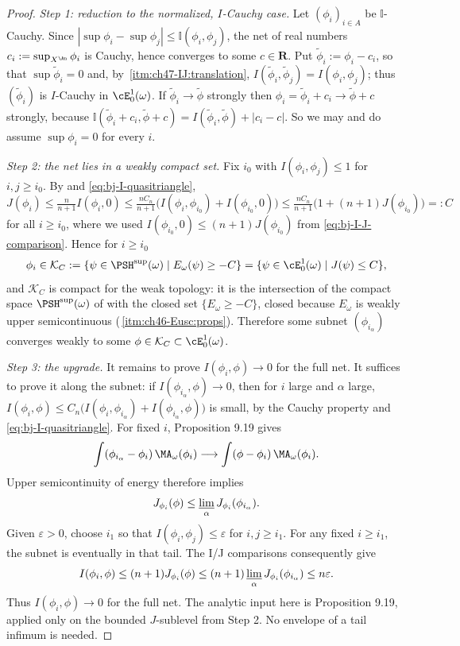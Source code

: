 \begin{proof}
\emph{Step 1: reduction to the normalized, $I$-Cauchy case.}  Let
$(\phi_i)_{i\in A}$ be $\mathbb I$-Cauchy.  Since
$|\sup\phi_i-\sup\phi_j|\le\mathbb I(\phi_i,\phi_j)$, the net of real
numbers $c_i:=\sup_{X^{\An}}\phi_i$ is Cauchy, hence converges to some
$c\in\mathbf R$.  Put $\tilde\phi_i:=\phi_i-c_i$, so that
$\sup\tilde\phi_i=0$ and, by
\,\cref{itm:ch47-IJ:translation},
$I(\tilde\phi_i,\tilde\phi_j)=I(\phi_i,\phi_j)$; thus
$(\tilde\phi_i)$ is $I$-Cauchy in $\cE^1_0(\omega)$.  If
$\tilde\phi_i\to\tilde\phi$ strongly then
$\phi_i=\tilde\phi_i+c_i\to\tilde\phi+c$ strongly, because
$\mathbb I(\tilde\phi_i+c_i,\tilde\phi+c)
=I(\tilde\phi_i,\tilde\phi)+|c_i-c|$.  So we may and do assume
$\sup\phi_i=0$ for every $i$.

\emph{Step 2: the net lies in a weakly compact set.}  Fix $i_0$ with
$I(\phi_i,\phi_j)\le1$ for $i,j\ge i_0$.  By
 and \eqref{eq:bj-I-quasitriangle},
\[
 J(\phi_i)\le\tfrac n{n+1}I(\phi_i,0)
 \le\tfrac{nC_n}{n+1}\bigl(I(\phi_i,\phi_{i_0})+I(\phi_{i_0},0)\bigr)
 \le\tfrac{nC_n}{n+1}\bigl(1+(n+1)J(\phi_{i_0})\bigr)=:C
\]
for all $i\ge i_0$, where we used
$I(\phi_{i_0},0)\le(n+1)J(\phi_{i_0})$ from
\eqref{eq:bj-I-J-comparison}.  Hence for $i\ge i_0$
\[
 \phi_i\in\mathcal K_C:=\{\psi\in\PSH^{\sup}(\omega)
                   \mid E_\omega(\psi)\ge-C\}
 =\{\psi\in\cE^1_0(\omega)\mid J(\psi)\le C\},
\]
and $\mathcal K_C$ is compact for the weak topology: it is the intersection of
the compact space $\PSH^{\sup}(\omega)$ of
 with the closed set
$\{E_\omega\ge-C\}$, closed because $E_\omega$ is weakly upper
semicontinuous
(\,\cref{itm:ch46-Eusc:props}).  Therefore some
subnet $(\phi_{i_\alpha})$ converges weakly to some
$\phi\in\mathcal K_C\subset\cE^1_0(\omega)$.

\emph{Step 3: the upgrade.}  It remains to prove
$I(\phi_i,\phi)\to0$ for the full net.  It suffices to prove it along the
subnet: if $I(\phi_{i_\alpha},\phi)\to0$, then for $i$ large and
$\alpha$ large, $I(\phi_i,\phi)\le
C_n\bigl(I(\phi_i,\phi_{i_\alpha})+I(\phi_{i_\alpha},\phi)\bigr)$ is
small, by the Cauchy property and \eqref{eq:bj-I-quasitriangle}.  For fixed $i$, Proposition 9.19 gives
\[
 \int(\phi_{i_\alpha}-\phi_i)\,\MA_\omega(\phi_i)
 \longrightarrow\int(\phi-\phi_i)\,\MA_\omega(\phi_i).
\]
Upper semicontinuity of energy therefore implies
\[
 J_{\phi_i}(\phi)\le\varliminf_\alpha J_{\phi_i}(\phi_{i_\alpha}).
\]
Given $\varepsilon>0$, choose $i_1$ so that
$I(\phi_i,\phi_j)\le\varepsilon$ for $i,j\ge i_1$.
For any fixed $i\ge i_1$, the subnet is eventually in that tail.
The I/J comparisons consequently give
\[
 I(\phi_i,\phi)\le(n+1)J_{\phi_i}(\phi)
 \le(n+1)\varliminf_\alpha J_{\phi_i}(\phi_{i_\alpha})
 \le n\varepsilon.
\]
Thus $I(\phi_i,\phi)\to0$ for the full net. The analytic input here
is Proposition 9.19, applied only on the bounded $J$-sublevel from
Step 2. No envelope of a tail infimum is needed.


\end{proof}
